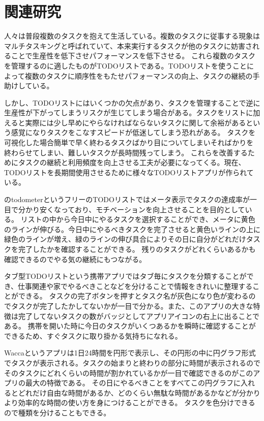 \chapter{関連研究}
\label{cha:related}
人々は普段複数のタスクを抱えて生活している。複数のタスクに従事する現象はマルチタスキングと呼ばれていて、本来実行するタスクが他のタスクに妨害されることで生産性を低下させパフォーマンスを低下させる。
これら複数のタスクを管理するのに適したものがTODOリストである。TODOリストを使うことによって複数のタスクに順序性をもたせパフォーマンスの向上、タスクの継続の手助けしている。

しかし、TODOリストにはいくつかの欠点があり、タスクを管理することで逆に生産性が下がってしまうリスクが生じてしまう場合がある。タスクをリストに加えると実際には少し早めにやらなければならないタスクに関して余裕があるという感覚になりタスクをこなすスピードが低迷してしまう恐れがある。
タスクを可視化した場合簡単で早く終わるタスクばかり目についてしまいそればかりを終わらせてしまい、難しいタスクが長時間残ってしまう。
これらを改善するためにタスクの継続と利用頻度を向上させる工夫が必要になってくる。現在、TODOリストを長期間使用させるために様々なTODOリストアプリが作られている。

\cite{todometer}のtodometerというフリーのTODOリストではメータ表示でタスクの達成率が一目で分かり安くなっており、モチベーションを向上させることを目的としている。
リストの中から今日中にやるタスクを選択することができ、メータに黄色のラインが伸びる。今日中にやるべきタスクを完了させると黄色いラインの上に緑色のラインが増え、緑のラインの伸び具合によりその日に自分がどれだけタスクを完了したかを確認することができる。
残りのタスクがどれくらいあるかも確認できるのでやる気の継続にもつながる。

タブ型TODOリスト\cite{tab}という携帯アプリではタブ毎にタスクを分類することができ、仕事関連や家でやるべきことなどを分けることで情報をきれいに整理することができる。
タスクの完了ボタンを押すとタスク名が灰色になり色が変わるのでタスクが完了したかしてないかが一目で分かる。また、このアプリの大きな特徴は完了してないタスクの数がバッジとしてアプリアイコンの右上に出ることである。
携帯を開いた時に今日のタスクがいくつあるかを瞬時に確認することができるため、すぐタスクに取り掛かる気持ちになれる。

Wacca\cite{Wacca}というアプリは1日24時間を円形で表示し、その円形の中に円グラフ形式でタスクが表示される。タスクの始まりと終わりの部分に時間が表示されるのでそのタスクにどれくらいの時間が割かれているかが一目で確認できるのがこのアプリの最大の特徴である。
その日にやるべきことをすべてこの円グラフに入れるとどれだけ自由な時間があるか、どのくらい無駄な時間があるかなどが分かりより効率的な時間の使い方を身につけることができる。
タスクを色分けできるので種類を分けることもできる。

